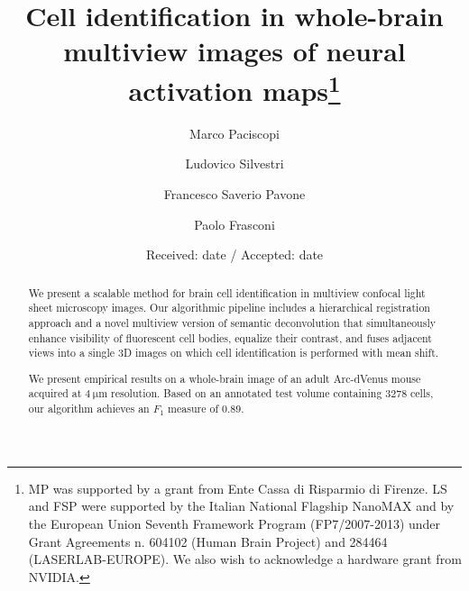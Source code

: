 \documentclass[smallextended]{svjour3}       %
\begin{document}
\title{Cell identification in whole-brain multiview images of neural activation
maps\thanks{MP was supported by a grant from Ente Cassa di Risparmio di Firenze.
LS and FSP were supported by the Italian National Flagship
NanoMAX and by the European Union Seventh Framework Program (FP7/2007-2013)
under Grant Agreements n. 604102 (Human Brain Project) and 284464 (LASERLAB-EUROPE).
We also wish to acknowledge a hardware grant from NVIDIA.}
}


\author{Marco Paciscopi  \and
        Ludovico Silvestri \and
        Francesco Saverio Pavone \and
        Paolo Frasconi
}



\date{Received: date / Accepted: date}


\maketitle

\begin{abstract}
  We present a scalable method for brain cell identification in
  multiview confocal light sheet microscopy images. Our algorithmic
  pipeline includes a hierarchical registration approach and a novel
  multiview version of semantic deconvolution that simultaneously
  enhance visibility of fluorescent cell bodies, equalize their
  contrast, and fuses adjacent views into a single 3D images on which
  cell identification is performed with mean shift.

  We present empirical results on a whole-brain image of an adult
  Arc-dVenus mouse acquired at $\SI{4}{\micro\meter}$
  resolution. Based on an annotated test volume containing 3278 cells,
  our algorithm achieves an $F_1$ measure of 0.89.

\end{abstract}
\end{document}
